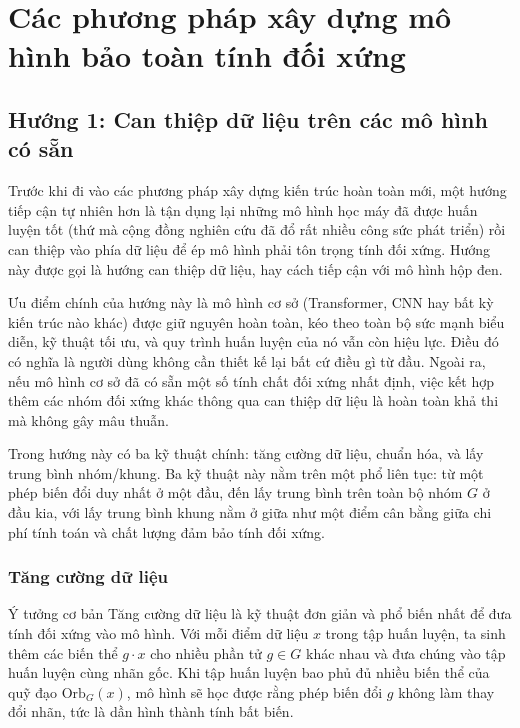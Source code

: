 \section{Các phương pháp xây dựng mô hình bảo toàn tính đối xứng}
\label{sec:phuong-phap}

\subsection{Hướng 1: Can thiệp dữ liệu trên các mô hình có sẵn}
\label{subsec:off-the-shelf}

Trước khi đi vào các phương pháp xây dựng kiến trúc hoàn toàn mới, một hướng tiếp cận tự nhiên hơn là tận dụng lại những mô hình học máy đã được huấn luyện tốt (thứ mà cộng đồng nghiên cứu đã đổ rất nhiều công sức phát triển) rồi can thiệp vào phía dữ liệu để ép mô hình phải tôn trọng tính đối xứng. Hướng này được gọi là hướng can thiệp dữ liệu, hay cách tiếp cận với mô hình hộp đen.

Ưu điểm chính của hướng này là mô hình cơ sở (Transformer, CNN hay bất kỳ kiến trúc nào khác) được giữ nguyên hoàn toàn, kéo theo toàn bộ sức mạnh biểu diễn, kỹ thuật tối ưu, và quy trình huấn luyện của nó vẫn còn hiệu lực. Điều đó có nghĩa là người dùng không cần thiết kế lại bất cứ điều gì từ đầu. Ngoài ra, nếu mô hình cơ sở đã có sẵn một số tính chất đối xứng nhất định, việc kết hợp thêm các nhóm đối xứng khác thông qua can thiệp dữ liệu là hoàn toàn khả thi mà không gây mâu thuẫn.

Trong hướng này có ba kỹ thuật chính: tăng cường dữ liệu, chuẩn hóa, và lấy trung bình nhóm/khung. Ba kỹ thuật này nằm trên một phổ liên tục: từ một phép biến đổi duy nhất ở một đầu, đến lấy trung bình trên toàn bộ nhóm $G$ ở đầu kia, với lấy trung bình khung nằm ở giữa như một điểm cân bằng giữa chi phí tính toán và chất lượng đảm bảo tính đối xứng.

\subsubsection{Tăng cường dữ liệu}
\label{subsubsec:data-augmentation}

\begin{infobox}{Ý tưởng cơ bản}
Tăng cường dữ liệu là kỹ thuật đơn giản và phổ biến nhất để đưa tính đối xứng vào mô hình. Với mỗi điểm dữ liệu $x$ trong tập huấn luyện, ta sinh thêm các biến thể $g \cdot x$ cho nhiều phần tử $g \in G$ khác nhau và đưa chúng vào tập huấn luyện cùng nhãn gốc. Khi tập huấn luyện bao phủ đủ nhiều biến thể của quỹ đạo $\mathrm{Orb}_G(x)$, mô hình sẽ học được rằng phép biến đổi $g$ không làm thay đổi nhãn, tức là dần hình thành tính bất biến.
\end{infobox}

